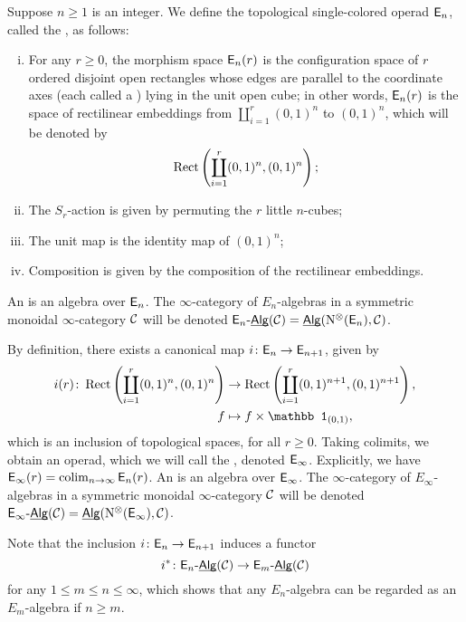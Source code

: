 \documentclass[twoside]{article}
\begin{document}
\begin{definition}
    Suppose $n\ge 1$ is an integer. We define the topological single-colored
    operad $\mathsf{E}_n$, called the , as follows:
    \begin{enumerate}[i)]
        \item For any $r\ge 0$, the morphism space $\mathsf{E}_n(r)$ is the configuration space
        of $r$ ordered disjoint open rectangles whose edges are parallel to the coordinate axes (each called a )
        lying in the unit open cube; in other words,
        $\mathsf{E}_n(r)$ is the space of rectilinear embeddings
        from $\coprod_{i=1}^r(0,1)^n$ to $(0,1)^n$, which will be denoted by \[\operatorname{Rect}\left(\coprod_{i=1}^r(0,1)^n,(0,1)^n\right);\]
        \item The $S_r$-action is given by permuting the $r$ little $n$-cubes;
        \item The unit map is the identity map of $(0,1)^n$;
        \item Composition is given by the composition of the rectilinear embeddings.
    \end{enumerate}
    An  is an algebra over $\mathsf{E}_n$. The $\infty$-category
    of $E_n$-algebras in a symmetric monoidal $\infty$-category $\cal C$
    will be denoted $\mathsf{E}_n\text{-}\underline{\smash{\mathsf{Alg}}}({\cal C})=\underline{\smash{\mathsf{Alg}}}(\mathrm{N}^\otimes(\mathsf{E}_n),{\cal C})$.
\end{definition}

By definition, there exists a canonical map $i\colon\mathsf{E}_n\to \mathsf{E}_{n+1}$,
given by \[\begin{aligned}i(r)\:\Rect\9\coprod_{i=1}^r(0,1)^n,(0,1)^n\0&\to
\Rect\9\coprod_{i=1}^r(0,1)^{n+1},(0,1)^{n+1}\0,\\
f&\mapsto f\times\mathbb1_{(0,1)},\end{aligned}\] which is an inclusion of topological spaces,
for all $r\ge 0$. Taking colimits, we obtain an operad, which we will call
the , denoted $\mathsf{E}_\infty$.
Explicitly, we have $\mathsf{E}_\infty(r)=\mathop{\operatorname{colim}}_{n\to\infty}\mathsf{E}_n(r)$.
An  is an algebra over $\mathsf{E}_\infty$. 
The $\infty$-category of $E_\infty$-algebras in a symmetric monoidal
$\infty$-category $\cal C$ will be denoted $\mathsf{E}_\infty\text{-}\underline{\smash{\mathsf{Alg}}}({\cal C})=\underline{\smash{\mathsf{Alg}}}(\mathrm{N}^\otimes(\mathsf{E}_\infty),{\cal C})$.

Note that the inclusion $i\colon\mathsf{E}_n\to \mathsf{E}_{n+1}$ induces a functor \[i^*\colon\mathsf{E}_n\text{-}\underline{\smash{\mathsf{Alg}}}(\mathcal C)\to 
{\mathsf{E}}_{m}\text{-}\underline{\smash{\mathsf{Alg}}}(\cal C)\] for any $1\le m\le n\le\infty$, which shows that
any $E_n$-algebra can be regarded as an $E_m$-algebra if $n\ge m$.
\end{document}
